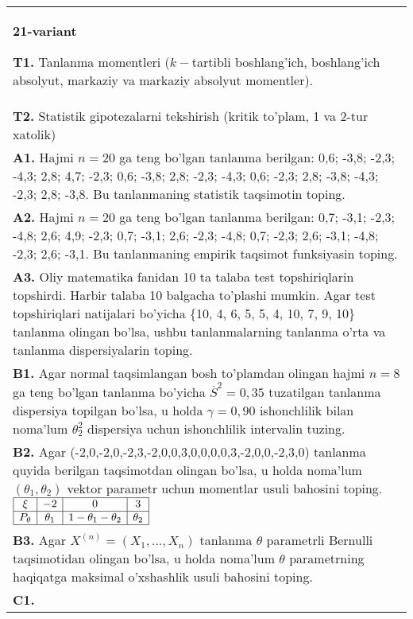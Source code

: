 \documentclass{article}
\begin{document}
\begin{tabular}{m{17cm}}
\textbf{21-variant}
\newline

\textbf{T1.} 
Tanlanma momentleri (\(k -\)tartibli boshlang'ich, boshlang'ich absolyut, markaziy va markaziy absolyut momentler).
\\
\textbf{T2.} 
Statistik gipotezalarni tekshirish (kritik to'plam, 1 va 2-tur xatolik)
\\
\textbf{A1.} 
Hajmi \(n = 20\) ga teng bo'lgan tanlanma berilgan: 0,6; -3,8; -2,3; -4,3; 2,8; 4,7; -2,3; 0,6; -3,8; 2,8; -2,3; -4,3; 0,6; -2,3; 2,8; -3,8; -4,3; -2,3; 2,8; -3,8. Bu tanlanmaning statistik taqsimotin toping.
\\
\textbf{A2.} 
Hajmi \(n = 20\) ga teng bo'lgan tanlanma berilgan: 0,7; -3,1; -2,3; -4,8; 2,6; 4,9; -2,3; 0,7; -3,1; 2,6; -2,3; -4,8; 0,7; -2,3; 2,6; -3,1; -4,8; -2,3; 2,6; -3,1. Bu tanlanmaning empirik taqsimot funksiyasin toping.
\\
\textbf{A3.} 
Oliy matematika fanidan 10 ta talaba test topshiriqlarin topshirdi. Harbir talaba 10 balgacha to'plashi mumkin. Agar test topshiriqlari natijalari bo'yicha \{10, 4, 6, 5, 5, 4, 10, 7, 9, 10\} tanlanma olingan bo'lsa, ushbu tanlanmalarning tanlanma o'rta va tanlanma dispersiyalarin toping.
\\
\textbf{B1.} 
Agar normal taqsimlangan bosh to'plamdan olingan hajmi \(n = 8\) ga teng bo'lgan tanlanma bo'yicha \({\overline{S}}^{2} = 0,35\) tuzatilgan tanlanma dispersiya topilgan bo'lsa, u holda \(\gamma = 0,90\) ishonchlilik bilan noma'lum \(\theta_{2}^{2}\) dispersiya uchun ishonchlilik intervalin tuzing.
\\
\textbf{B2.} 
Agar (-2,0,-2,0,-2,3,-2,0,0,3,0,0,0,0,3,-2,0,0,-2,3,0) tanlanma quyida berilgan taqsimotdan olingan bo'lsa, u holda noma'lum \(\left( \theta_{1},\theta_{2} \right)\) vektor parametr uchun momentlar usuli bahosini toping.
$\begin{array}{|c|c|c|c|}
    \hline
    \xi & - 2 & 0 & 3\\
    \hline
    P_{\theta} & \theta_{1} & 1 - \theta_{1} - \theta_{2} & \theta_{2} \\
    \hline
\end{array}$
\\
\textbf{B3.} 
Agar \(X^{(n)} = \left( X_{1},...,X_{n} \right)\) tanlanma \(\theta\) parametrli Bernulli taqsimotidan olingan bo'lsa, u holda noma'lum \(\theta\) parametrning haqiqatga maksimal o'xshashlik usuli bahosini toping.
\\
\textbf{C1.} 

\end{tabular}
\end{document}
